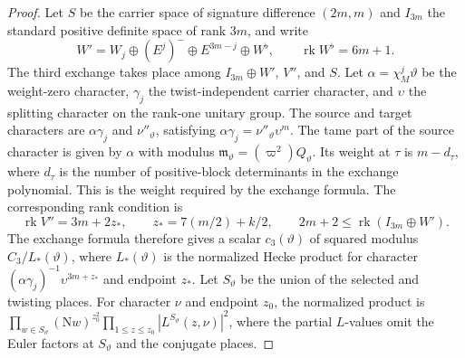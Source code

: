 \begin{proof}
Let $S$ be the carrier space of signature difference $(2m,m)$ and $I_{3m}$ the standard positive definite space of rank $3m$, and write
\[
 W'=W_j\oplus(E^j)^-\oplus E^{3m-j}\oplus W^\flat ,
 \qquad \operatorname{rk}W^\flat=6m+1 .
\]
The third exchange takes place among $I_{3m}\oplus W'$, $V''$, and $S$. Let $\alpha=\chi_M^j\vartheta$ be the weight-zero character, $\gamma_j$ the twist-independent carrier character, and $\upsilon$ the splitting character on the rank-one unitary group. The source and target characters are $\alpha\gamma_j$ and $\nu''_\vartheta$, satisfying $\alpha\gamma_j=\nu''_\vartheta\upsilon^m$. The tame part of the source character is given by $\alpha$ with modulus $\mathfrak m_\vartheta=(\varpi^2)Q_\vartheta$. Its weight at $\tau$ is $m-d_\tau$, where $d_\tau$ is the number of positive-block determinants in the exchange polynomial. This is the weight required by the exchange formula. The corresponding rank condition is
\[
 \operatorname{rk}V''=3m+2z_*,
 \qquad z_*=7(m/2)+k/2,
 \qquad 2m+2\le\operatorname{rk}(I_{3m}\oplus W').
\]
The exchange formula therefore gives a scalar $c_3(\vartheta)$ of squared modulus $C_3/L_*(\vartheta)$, where $L_*(\vartheta)$ is the normalized Hecke product for character $(\alpha\gamma_j)^{-1}\upsilon^{3m+z_*}$ and endpoint $z_*$. Let $S_\vartheta$ be the union of the selected and twisting places. For character $\nu$ and endpoint $z_0$, the normalized product is $\prod_{w\in S_\vartheta}(\mathrm Nw)^{z_0^2}\prod_{1\le z\le z_0}|L^{S_\vartheta}(z,\nu)|^2$, where the partial $L$-values omit the Euler factors at $S_\vartheta$ and the conjugate places.


\end{proof}
